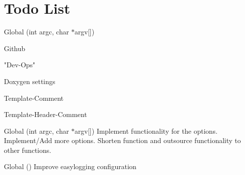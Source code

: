 \chapter{Todo List}
\hypertarget{todo}{}\label{todo}

\begin{DoxyRefList}
\item[Global \doxylink{main_8cpp_a0ddf1224851353fc92bfbff6f499fa97}{main} (int argc, char \texorpdfstring{$\ast$}{*}argv\mbox{[}\mbox{]})]\label{todo__todo000003}%
%

\begin{DoxyItemize}
\item Github
\item "{}\+Dev-\/\+Ops"{}
\item Doxygen settings
\item Template-\/\+Comment
\item Template-\/\+Header-\/\+Comment  
\end{DoxyItemize}
\item[Global \doxylink{classutils_1_1StartupHandler_a9cdd57841cee245c1a1c94b0efe6549c}{utils\+::Startup\+Handler\+::get\+Options} (int argc, char \texorpdfstring{$\ast$}{*}argv\mbox{[}\mbox{]})]\label{todo__todo000002}%
%
 Implement functionality for the options. Implement/\+Add more options. Shorten function and outsource functionality to other functions. 
\item[Global \doxylink{classutils_1_1StartupHandler_ade70b280d4385f270829b177da44b169}{utils\+::Startup\+Handler\+::init\+Easy\+Logging} ()]\label{todo__todo000001}%
%
 Improve easylogging configuration 
\end{DoxyRefList}